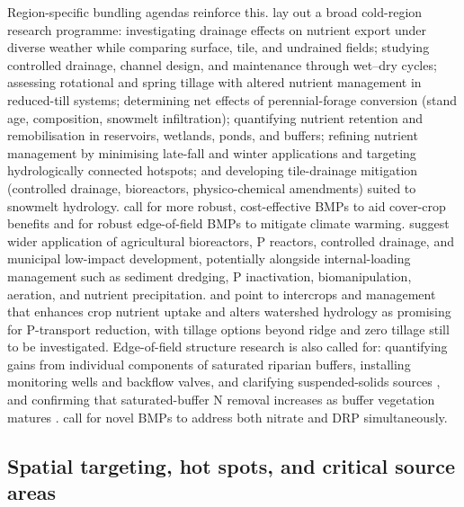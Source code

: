 Region-specific bundling agendas reinforce this. \textcite{Baulch2019} lay out a broad cold-region research programme: investigating drainage effects on nutrient export under diverse weather while comparing surface, tile, and undrained fields; studying controlled drainage, channel design, and maintenance through wet--dry cycles; assessing rotational and spring tillage with altered nutrient management in reduced-till systems; determining net effects of perennial-forage conversion (stand age, composition, snowmelt infiltration); quantifying nutrient retention and remobilisation in reservoirs, wetlands, ponds, and buffers; refining nutrient management by minimising late-fall and winter applications and targeting hydrologically connected hotspots; and developing tile-drainage mitigation (controlled drainage, bioreactors, physico-chemical amendments) suited to snowmelt hydrology. \textcite{Gupta2023} call for more robust, cost-effective BMPs to aid cover-crop benefits and for robust edge-of-field BMPs to mitigate climate warming. \textcite{Husk2024} suggest wider application of agricultural bioreactors, P reactors, controlled drainage, and municipal low-impact development, potentially alongside internal-loading management such as sediment dredging, P inactivation, biomanipulation, aeration, and nutrient precipitation. \textcite{HernandezRamirez2011} and \textcite{GAYNOR1995b} point to intercrops and management that enhances crop nutrient uptake and alters watershed hydrology as promising for P-transport reduction, with tillage options beyond ridge and zero tillage still to be investigated. Edge-of-field structure research is also called for: quantifying gains from individual components of saturated riparian buffers, installing monitoring wells and backflow valves, and clarifying suspended-solids sources \parencite{Singh2024b}, and confirming that saturated-buffer N removal increases as buffer vegetation matures \parencite{Jaynes2019}. \textcite{Spiese2023} call for novel BMPs to address both nitrate and DRP simultaneously.

\subsection{Spatial targeting, hot spots, and critical source areas}

